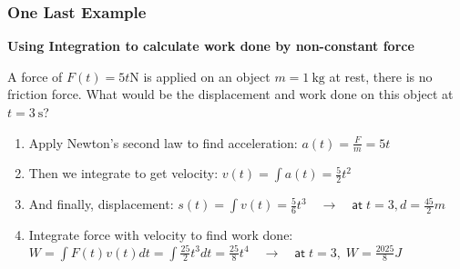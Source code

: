 \documentclass[12pt,compress,aspectratio=169]{beamer}
\begin{document}
\begin{frame}
  \frametitle{One Last Example}

  \textbf{Using Integration to calculate work done by non-constant force}

  A force of $F(t)=5t\si{\N}$ is applied on an object $m=\SI{1}{\kg}$ at
  rest, there is no friction force. What would be the displacement and work
  done on this object at $t=\SI{3}{\s}$?

  \begin{enumerate}
  \item<2-> Apply Newton's second law to find acceleration:
    $\displaystyle a(t)=\frac{F}{m}=5t$
  \item<3-> Then we integrate to get velocity:
    $\displaystyle v(t)=\int a(t)=\frac{5}{2}t^2$
  \item<4-> And finally, displacement:
    $\displaystyle s(t)=\int v(t)=\frac{5}{6}t^3\quad\longrightarrow\quad
    \textsf{at}\;t=3, \boxed{d=\frac{45}{2}\si{m}}$
  \item<5-> Integrate force with velocity to find work done:
    $\displaystyle W=\int F(t)v(t)dt =\int\frac{25}{2}t^3dt=\frac{25}{8}t^4
    \quad\longrightarrow\quad
    \textsf{at}\;t=3,\;\boxed{W=\frac{2025}{8}\si{J}}$
  \end{enumerate}
\end{frame}
\end{document}
